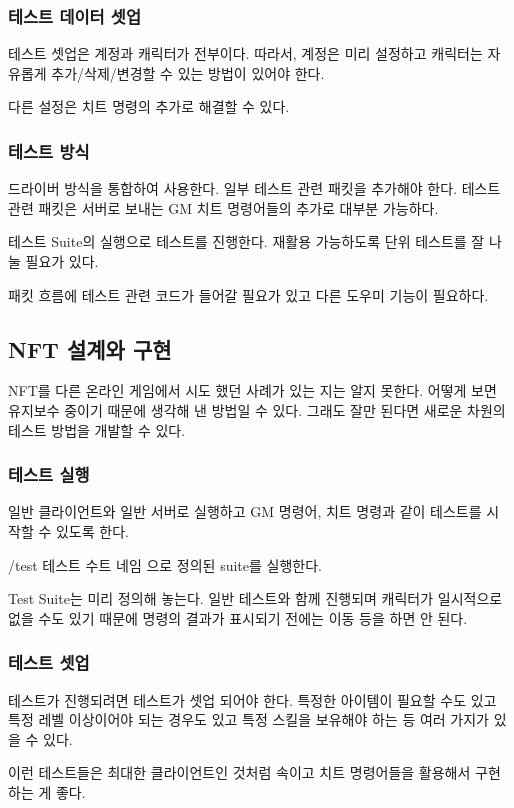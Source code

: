 \documentclass[chapter,kosection, 10.5pt, romanfixed, a4paper]{oblivoir}
\begin{document}
\subsubsection{테스트 데이터 셋업}
테스트 셋업은 계정과 캐릭터가 전부이다. 따라서, 계정은 미리 설정하고 
캐릭터는 자유롭게 추가/삭제/변경할 수 있는 방법이 있어야 한다. 

다른 설정은 치트 명령의 추가로 해결할 수 있다. 

\subsubsection{테스트 방식}
드라이버 방식을 통합하여 사용한다. 일부 테스트 관련 패킷을 추가해야 한다. 
테스트 관련 패킷은 서버로 보내는 GM 치트 명령어들의 추가로 대부분 가능하다. 

테스트 Suite의 실행으로 테스트를 진행한다. 재활용 가능하도록 단위 테스트를 잘 나눌 필요가 있다. 

패킷 흐름에 테스트 관련 코드가 들어갈 필요가 있고 다른 도우미 기능이 필요하다. 


\subsection{NFT 설계와 구현}
NFT를 다른 온라인 게임에서 시도 했던 사례가 있는 지는 알지 못한다. 
어떻게 보면 유지보수 중이기 때문에 생각해 낸 방법일 수 있다. 
그래도 잘만 된다면 새로운 차원의 테스트 방법을 개발할 수 있다. 

\subsubsection{테스트 실행}
일반 클라이언트와 일반 서버로 실행하고 GM 명령어, 치트 명령과 같이 테스트를 시작할 수 있도록 한다. 

/test 테스트 수트 네임 으로 정의된 suite를 실행한다. 

Test Suite는 미리 정의해 놓는다. 
일반 테스트와 함께 진행되며 캐릭터가 일시적으로 없을 수도 있기 때문에 명령의 결과가 표시되기 전에는 이동 등을 하면 안 된다. 


\subsubsection{테스트 셋업}
테스트가 진행되려면 테스트가 셋업 되어야 한다. 특정한 아이템이 필요할 수도 있고 
특정 레벨 이상이어야 되는 경우도 있고 특정 스킬을 보유해야 하는 등 여러 가지가 있을 수 있다. 

이런 테스트들은 최대한 클라이언트인 것처럼 속이고 치트 명령어들을 활용해서 구현하는 게 좋다. 
\end{document}
